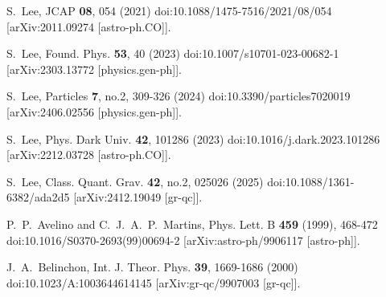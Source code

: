 \documentclass[jkps,preprint,fleqn]{revtex4} %
\begin{document}
\begin{thebibliography}{999}


S.~Lee,
JCAP \textbf{08}, 054 (2021)
doi:10.1088/1475-7516/2021/08/054
[arXiv:2011.09274 [astro-ph.CO]].


S.~Lee,
Found. Phys. \textbf{53}, 40 (2023)
doi:10.1007/s10701-023-00682-1
[arXiv:2303.13772 [physics.gen-ph]].

S.~Lee,
Particles \textbf{7}, no.2, 309-326 (2024)
doi:10.3390/particles7020019
[arXiv:2406.02556 [physics.gen-ph]].


S.~Lee,
Phys. Dark Univ. \textbf{42}, 101286 (2023)
doi:10.1016/j.dark.2023.101286
[arXiv:2212.03728 [astro-ph.CO]].


S.~Lee,
Class. Quant. Grav. \textbf{42}, no.2, 025026 (2025)
doi:10.1088/1361-6382/ada2d5
[arXiv:2412.19049 [gr-qc]].



P.~P.~Avelino and C.~J.~A.~P.~Martins,
Phys. Lett. B \textbf{459} (1999), 468-472
doi:10.1016/S0370-2693(99)00694-2
[arXiv:astro-ph/9906117 [astro-ph]].

J.~A.~Belinchon,
Int. J. Theor. Phys. \textbf{39}, 1669-1686 (2000)
doi:10.1023/A:1003644614145
[arXiv:gr-qc/9907003 [gr-qc]].


\end{thebibliography}
\end{document}
